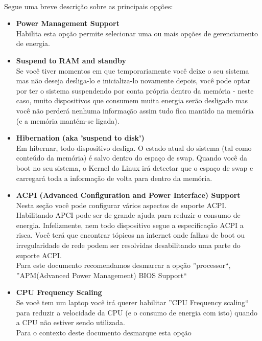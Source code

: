 \documentclass[a4paper,10pt]{article}
\begin{document}
  \paragraph{}
  Segue uma breve descrição sobre as principais opções:
  \begin{itemize}
  \item \textbf{Power Management Support}
	\\Habilita esta opção permite selecionar uma ou mais opções de gerenciamento de energia.
  \item \textbf{Suspend to RAM and standby}
	\\Se você tiver momentos em que temporariamente você deixe o seu sistema mas não deseja desliga-lo e inicializa-lo novamente
	  depois, você pode optar por ter o sistema suspendendo por conta própria dentro da memória - neste caso, muito dispositivos
	  que consumem muita energia serão desligado mas você não perderá nenhuma informação assim tudo fica mantido na memória (e a
	  memória mantém-se ligada).
  \item \textbf{Hibernation (aka 'suspend to disk')}
	\\Em hibernar, todo dispositivo desliga. O estado atual do sistema (tal como conteúdo da memória) é salvo dentro do espaço de swap.
	  Quando você da boot no seu sistema, o Kernel do Linux irá detectar que o espaço de swap e carregará toda a informação de volta
	  para dentro da memória.
  \item \textbf{ACPI (Advanced Configuration and Power Interface) Support}
	\\Nesta seção você pode configurar vários aspectos de suporte ACPI. Habilitando APCI pode ser de grande ajuda para reduzir o 
	  consumo de energia. Infelizmente, nem todo dispositivo segue a especificação ACPI a risca. Você terá que encontrar tópicos
	  na internet onde falhas de boot ou irregularidade de rede podem ser resolvidas desabilitando uma parte do suporte ACPI.
	\\Para este documento recomendamos desmarcar a opção ''processor``, ''APM(Advanced Power Management) BIOS Support``
  \item \textbf{CPU Frequency Scaling}
	\\Se você tem um laptop você irá querer habilitar ''CPU Frequency scaling`` para reduzir a velocidade da CPU (e o consumo de energia
	  com isto) quando a CPU não estiver sendo utilizada.
	\\Para o contexto deste documento desmarque esta opção
  \end{itemize}
\end{document}
